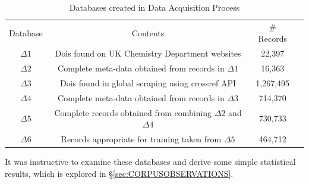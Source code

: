 \begin{table}[H]
\caption{Databases created in Data Acquisition Process}
\label{tab:DATABASES}
\begin{tabular}{||c|c|c|c||}
\hline 
Database &  Contents & \# Records\\
$\Delta1$ & Dois found on UK Chemistry Department websites & 22,397 \\
$\Delta2$ & Complete meta-data obtained from records in $\Delta1$ & 16,363 \\
$\Delta3$ & Dois found in global scraping using crossref API & 1,267,495  \\
$\Delta4$ & Complete meta-data obtained from records in $\Delta3$ & 714,370 \\
$\Delta5$ & Complete records obtained from combining $\Delta2$ and $\Delta4$ & 730,733 \\
$\Delta6$ & Records appropriate for training taken from $\Delta5$ & 464,712 \\
\hline
\end{tabular}
\end{table}

It was instructive to examine these databases and derive some simple statistical results, which is explored in \S\ref{sec:CORPUSOBSERVATIONS}.